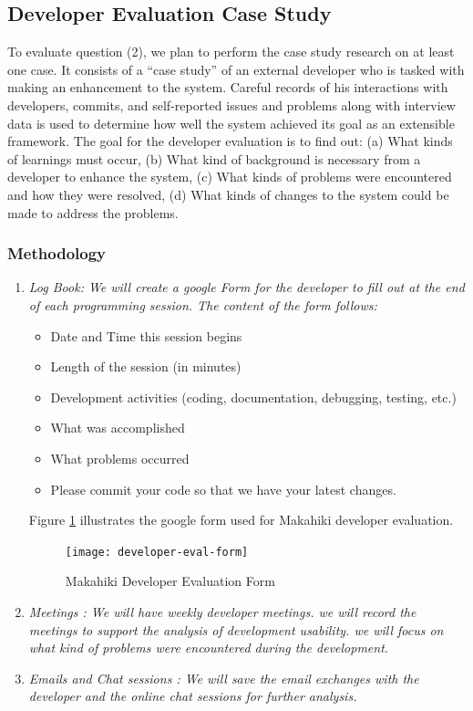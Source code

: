 \documentclass[11pt]{article}
\begin{document}
\subsection{Developer Evaluation Case Study}
To evaluate question (2), we plan to perform the case study research on at least one case. It consists of a ``case study'' of an external developer who is tasked with making an enhancement to the system.  Careful records of his interactions with developers, commits, and self-reported issues and problems along with interview data is used to determine how well the system achieved its goal as an extensible framework. The goal for the developer evaluation is to find out: (a) What kinds of learnings must occur, (b) What kind of background is necessary from a developer to enhance the system, (c) What kinds of problems were encountered and how they were resolved, (d) What kinds of changes to the system could be made to address the problems.

\subsubsection{Methodology}
\begin{enumerate}
\item \em Log Book\em: We will create a google Form for the developer to fill out at the end of each programming session. The content of the form follows:
 \begin{itemize} 
 \item Date and Time this session begins
 \item Length of the session (in minutes)
 \item Development activities (coding, documentation, debugging, testing, etc.)
 \item What was accomplished
 \item What problems occurred
 \item Please commit your code so that we have your latest changes.
 \end{itemize}

Figure \ref{fig:developer-eval-form} illustrates the google form used for Makahiki developer evaluation.

\begin{figure}[htbp] %
   \centering
   \texttt{[image: developer-eval-form]} 
   \caption{Makahiki Developer Evaluation Form}
   \label{fig:developer-eval-form}
\end{figure}
 
\item \em Meetings \em: We will have weekly developer meetings. we will record the meetings to support the analysis of development usability. we will focus on what kind of problems were encountered during the development.

\item \em Emails and Chat sessions \em: We will save the email exchanges with the developer and the online chat sessions for further analysis.

\end{enumerate}
\end{document}
